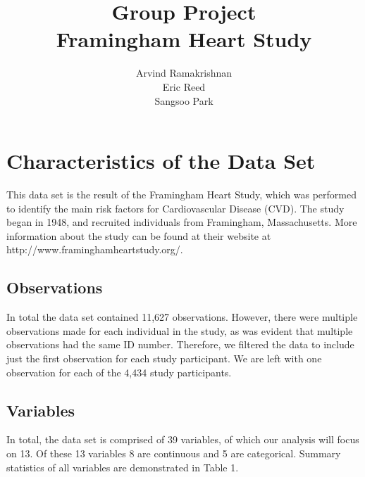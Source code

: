 \documentclass{article}\usepackage[]{graphicx}\usepackage[]{color}
\begin{document}
\title{Group Project \\ Framingham Heart Study}
\author{Arvind Ramakrishnan \\ Eric Reed \\ Sangsoo Park}
\maketitle
\tableofcontents
{}
\newpage





\section{Characteristics of the Data Set}

  This data set is the result of the Framingham Heart Study, which was performed to identify the main risk factors for Cardiovascular Disease (CVD).  The study began in 1948, and recruited individuals from Framingham, Massachusetts. More information about the study can be found at their website at http://www.framinghamheartstudy.org/. 

\subsection{Observations}

In total the data set contained 11,627 observations. However, there were multiple observations made for each individual in the study, as was evident that multiple observations had the same ID number.  Therefore, we filtered the data to include just the first observation for each study participant. We are left with one observation for each of the 4,434 study participants.





\subsection{Variables}

In total, the data set is comprised of 39 variables, of which our analysis will focus on 13. Of these 13 variables 8 are continuous and 5 are categorical.  Summary statistics of all variables are demonstrated in Table 1.
\end{document}
